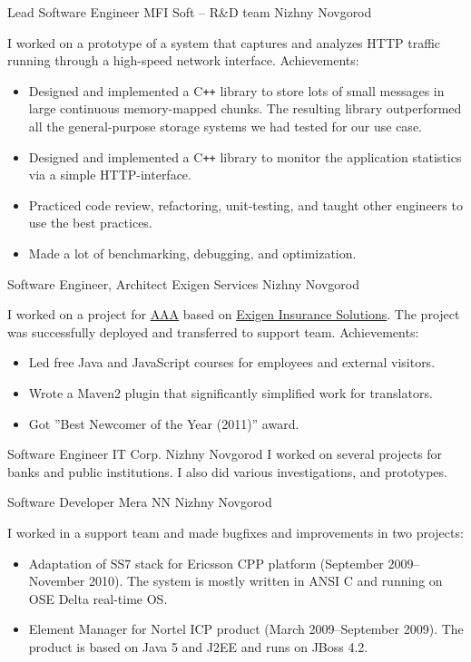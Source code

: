 \documentclass[11pt,a4paper,sans]{moderncv}
\newcommand{\Cpp}{C{}\texttt{++}}
\begin{document}
{Lead Software Engineer}
{MFI Soft -- R\&D team}
{Nizhny Novgorod}
{}
{I worked on a prototype of a system that captures and analyzes HTTP
traffic running through a high-speed network interface.
\newline{}
Achievements:
\begin{itemize}
\item Designed and implemented a \Cpp{} library to store lots of small
  messages in large continuous memory-mapped chunks. The resulting
  library outperformed all the general-purpose storage systems we had
  tested for our use case.
\item Designed and implemented a \Cpp{} library to monitor the
  application statistics via a simple HTTP-interface.
\item Practiced code review, refactoring, unit-testing, and taught
  other engineers to use the best practices.
\item Made a lot of benchmarking, debugging, and optimization.
\end{itemize}
}

{Software Engineer, Architect}
{Exigen Services}
{Nizhny Novgorod}
{}
{I worked on a project for
\href{http://www.aaa.com/PPInternational/International.html}{AAA}
based on
\href{http://www.exigeninsurance.com/business-solutions/overview.html}{Exigen Insurance Solutions}.
The project was successfully deployed and transferred to support team.
\newline{}
Achievements:
\begin{itemize}
\item Led free Java and JavaScript courses for employees and external
  visitors.
\item Wrote a Maven2 plugin that significantly simplified work for
  translators.
\item Got ''Best Newcomer of the Year (2011)'' award.
\end{itemize}
}

{Software Engineer}
{IT Corp.}
{Nizhny Novgorod}
{}
{I worked on several projects for banks and public institutions. I
  also did various investigations, and prototypes.}

{Software Developer}
{Mera NN}
{Nizhny Novgorod}
{}
{I worked in a support team and made bugfixes and improvements in two
  projects:
\begin{itemize}
\item Adaptation of SS7 stack for Ericsson CPP platform (September
  2009--November 2010).  The system is mostly written in ANSI C and
  running on OSE Delta real-time OS.
\item Element Manager for Nortel ICP product (March 2009--September
  2009).  The product is based on Java 5 and J2EE and runs on JBoss
  4.2.
\end{itemize}
}
\end{document}
